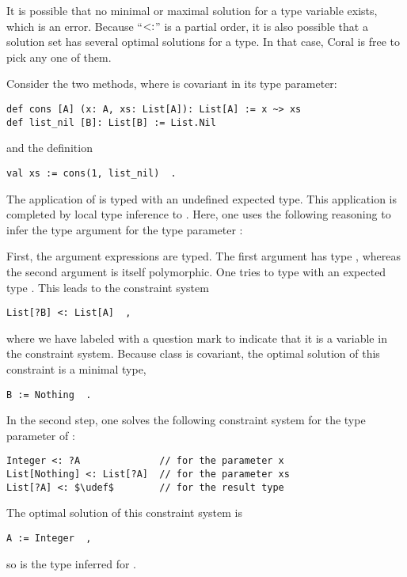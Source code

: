 It is possible that no minimal or maximal solution for a type variable exists, which is an error. Because ``$<:$'' is a partial order, it is also possible that a solution set has several optimal solutions for a type. In that case, Coral is free to pick any one of them. 

\example Consider the two methods, where  is covariant in its type parameter:
\begin{lstlisting}
def cons [A] (x: A, xs: List[A]): List[A] := x ~> xs
def list_nil [B]: List[B] := List.Nil
\end{lstlisting}
and the definition
\begin{lstlisting}
val xs := cons(1, list_nil)  .
\end{lstlisting}

The application of  is typed with an undefined expected type. This application is completed by local type inference to . Here, one uses the following reasoning to infer the type argument  for the type parameter :

First, the argument expressions are typed. The first argument  has type , whereas the second argument  is itself polymorphic. One tries to type  with an expected type . This leads to the constraint system
\begin{lstlisting}
List[?B] <: List[A]  ,
\end{lstlisting}
where we have labeled  with a question mark to indicate that it is a variable in the constraint system. Because class  is covariant, the optimal solution of this constraint is a minimal type, 
\begin{lstlisting}
B := Nothing  .
\end{lstlisting}

In the second step, one solves the following constraint system for the type parameter  of :
\begin{lstlisting}
Integer <: ?A              // for the parameter x
List[Nothing] <: List[?A]  // for the parameter xs
List[?A] <: $\udef$        // for the result type
\end{lstlisting}

The optimal solution of this constraint system is 
\begin{lstlisting}
A := Integer  ,
\end{lstlisting}
so  is the type inferred for . 

